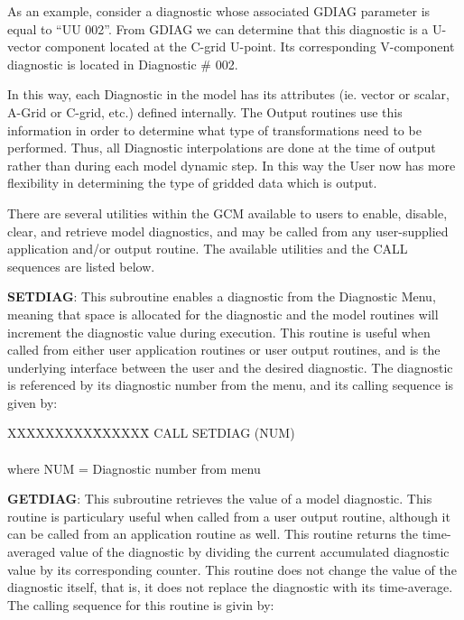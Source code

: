 As an example, consider a diagnostic whose associated GDIAG parameter is equal
to ``UU  002''.  From GDIAG we can determine that this diagnostic is a 
U-vector component located at the C-grid U-point.
Its corresponding V-component diagnostic is located in Diagnostic \# 002.

In this way, each Diagnostic in the model has its attributes (ie. vector or scalar,
A-Grid or C-grid, etc.) defined internally.  The Output routines
use this information in order to determine
what type of transformations need to be performed.  Thus, all Diagnostic
interpolations are done at the time of output rather than during each model dynamic step.
In this way the User now has more flexibility
in determining the type of gridded data which is output.

There are several utilities within the GCM available to users to enable, disable,
clear, and retrieve model diagnostics, and may be called from any user-supplied application
and/or output routine.  The available utilities and the CALL sequences are listed below.


{\bf SETDIAG}:  This subroutine enables a diagnostic from the Diagnostic Menu, meaning that 
space is allocated for the diagnostic and the
model routines will increment the diagnostic value during execution.  This routine is useful when
called from either user application routines or user output routines, and is the underlying interface
between the user and the desired diagnostic.  The diagnostic is referenced by its diagnostic
number from the menu, and its calling sequence is given by:

\begin{tabbing}
XXXXXXXXX\=XXXXXX\= \kill
\>        CALL SETDIAG (NUM) \\
\\
where \>  NUM   \>= Diagnostic number from menu \\
\end{tabbing}


{\bf GETDIAG}:  This subroutine retrieves the value of a model diagnostic.  This routine is
particulary useful when called from a user output routine, although it can be called from an
application routine as well.  This routine returns the time-averaged value of the diagnostic by
dividing the current accumulated diagnostic value by its corresponding counter.  This routine does
not change the value of the diagnostic itself, that is, it does not replace the diagnostic with its
time-average.  The calling sequence for this routine is givin by:

